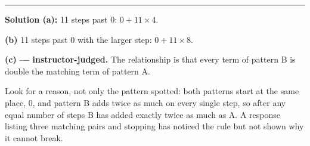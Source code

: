 \documentclass[12pt]{article}
\begin{document}
\vspace{0.15cm}\noindent\rule{\linewidth}{0.2pt}\vspace{0.15cm}


\textbf{Solution (a):} 11 steps past 0: $0 + 11 \times 4$. 

\textbf{(b)} 11 steps past 0 with the larger step: $0 + 11 \times 8$. 

\textbf{(c) --- instructor-judged.} The relationship is that every term of pattern B is double the matching term of pattern A.

Look for a reason, not only the pattern spotted: both patterns start at the same place, 0, and pattern B adds twice as much on every single step, so after any equal number of steps B has added exactly twice as much as A. A response listing three matching pairs and stopping has noticed the rule but not shown why it cannot break.
\end{document}
